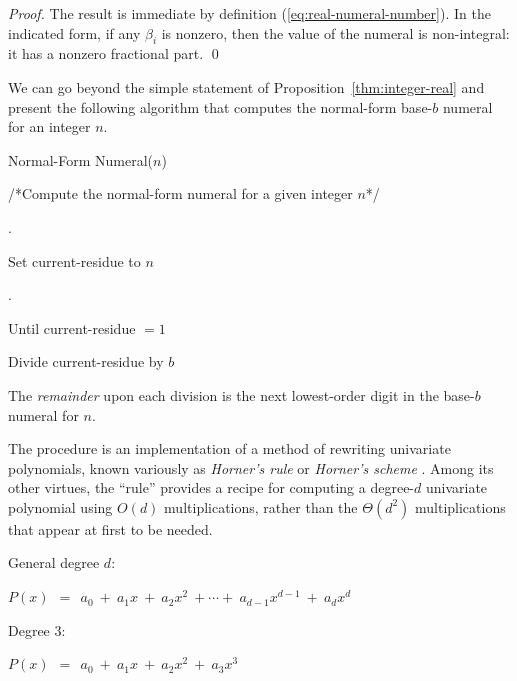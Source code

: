 \begin{proof}
The result is immediate by definition (\ref{eq:real-numeral-number}).
In the indicated form, if any $\beta_i$ is nonzero, then the {\sc
value} of the numeral is non-integral: it has a nonzero fractional part.
\qed
\end{proof}

We can go beyond the simple statement of
Proposition~\ref{thm:integer-real} and present the following algorithm
that computes the normal-form base-$b$ numeral for an integer $n$.

\bigskip

 {\small\sf Normal-Form
  Numeral}($n$)

/*Compute the normal-form numeral for a given integer $n$*/

\smallskip

.

Set {\sc current-residue} to $n$

\smallskip

. 

Until {\sc current-residue} $= 1$

Divide {\sc current-residue} by $b$

\medskip

\noindent
The {\em remainder} upon each division is the next lowest-order
digit in the base-$b$ numeral for $n$.


\bigskip

%
The procedure is an implementation of a method of rewriting univariate
polynomials, known variously as {\it Horner's rule} or {\it Horner's
  scheme} \cite{Horner}.  
 
Among its other virtues, the ``rule'' provides a recipe for computing
a degree-$d$ univariate polynomial using $O(d)$ multiplications,
rather than the $\Theta(d^2)$ multiplications that appear at first to
be needed.

\medskip


\noindent General degree $d$:

$P(x) \ \ = \ \ a_0 \ + \ a_1 x \ + \ a_2 x^2 \ + \cdots + \ a_{d-1}
x^{d-1} \ + \ a_d x^d$

\noindent Degree $3$:

$P(x) \ \ = \ \ a_0 \ + \ a_1 x \ + \ a_2 x^2 \ + \ a_3 x^3$

